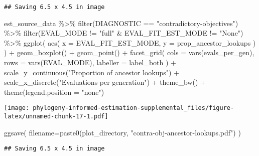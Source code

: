 \documentclass[
]{book}
\newenvironment{Shaded}{\begin{snugshade}}{\end{snugshade}}
\newcommand{\AttributeTok}[1]{\textcolor[rgb]{0.77,0.63,0.00}{#1}}
\newcommand{\FunctionTok}[1]{\textcolor[rgb]{0.00,0.00,0.00}{#1}}
\newcommand{\NormalTok}[1]{#1}
\newcommand{\SpecialCharTok}[1]{\textcolor[rgb]{0.00,0.00,0.00}{#1}}
\newcommand{\StringTok}[1]{\textcolor[rgb]{0.31,0.60,0.02}{#1}}
\begin{document}
\begin{verbatim}
## Saving 6.5 x 4.5 in image
\end{verbatim}

\begin{Shaded}
\begin{Highlighting}[]
\NormalTok{est\_source\_data }\SpecialCharTok{\%\textgreater{}\%}
  \FunctionTok{filter}\NormalTok{(DIAGNOSTIC }\SpecialCharTok{==} \StringTok{"contradictory{-}objectives"}\NormalTok{) }\SpecialCharTok{\%\textgreater{}\%}
  \FunctionTok{filter}\NormalTok{(EVAL\_MODE }\SpecialCharTok{!=} \StringTok{"full"} \SpecialCharTok{\&}\NormalTok{ EVAL\_FIT\_EST\_MODE }\SpecialCharTok{!=} \StringTok{"None"}\NormalTok{) }\SpecialCharTok{\%\textgreater{}\%}
  \FunctionTok{ggplot}\NormalTok{(}
      \FunctionTok{aes}\NormalTok{(}
        \AttributeTok{x =}\NormalTok{ EVAL\_FIT\_EST\_MODE,}
        \AttributeTok{y =}\NormalTok{ prop\_ancestor\_lookups}
\NormalTok{      )}
\NormalTok{    ) }\SpecialCharTok{+}
    \FunctionTok{geom\_boxplot}\NormalTok{() }\SpecialCharTok{+}
    \FunctionTok{geom\_point}\NormalTok{() }\SpecialCharTok{+}
    \FunctionTok{facet\_grid}\NormalTok{(}
      \AttributeTok{cols =} \FunctionTok{vars}\NormalTok{(evals\_per\_gen),}
      \AttributeTok{rows =} \FunctionTok{vars}\NormalTok{(EVAL\_MODE),}
      \AttributeTok{labeller =}\NormalTok{ label\_both}
\NormalTok{    ) }\SpecialCharTok{+}
    \FunctionTok{scale\_y\_continuous}\NormalTok{(}\StringTok{"Proportion of ancestor lookups"}\NormalTok{) }\SpecialCharTok{+}
    \FunctionTok{scale\_x\_discrete}\NormalTok{(}\StringTok{"Evaluations per generation"}\NormalTok{) }\SpecialCharTok{+}
    \FunctionTok{theme\_bw}\NormalTok{() }\SpecialCharTok{+}
    \FunctionTok{theme}\NormalTok{(}\AttributeTok{legend.position =} \StringTok{"none"}\NormalTok{)}
\end{Highlighting}
\end{Shaded}

\texttt{[image: phylogeny-informed-estimation-supplemental\_files/figure-latex/unnamed-chunk-17-1.pdf]}

\begin{Shaded}
\begin{Highlighting}[]
\FunctionTok{ggsave}\NormalTok{(}
   \AttributeTok{filename=}\FunctionTok{paste0}\NormalTok{(plot\_directory, }\StringTok{"contra{-}obj{-}ancestor{-}lookups.pdf"}\NormalTok{)}
\NormalTok{)}
\end{Highlighting}
\end{Shaded}

\begin{verbatim}
## Saving 6.5 x 4.5 in image
\end{verbatim}
\end{document}

